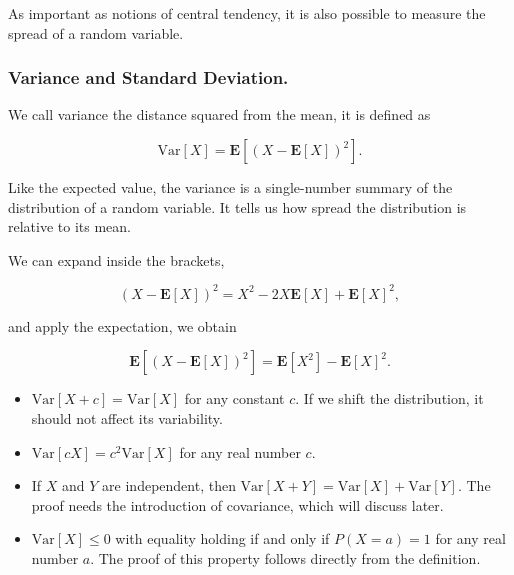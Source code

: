 \documentclass[12pt]{article}
\begin{document}
\vspace{.5cm}
As important as notions of central tendency, it is also possible to measure the spread 
of a random variable.

\subsubsection{Variance and Standard Deviation.}
We call variance the distance squared from the mean, it is defined as

\begin{equation}
\mbox{Var} [ X ] = \mathbf{E} \left[ ( X - \mathbf{E} [ X ] )^{2} \right].
\end{equation}

\noindent
Like the expected value, the variance is a single-number summary of 
the distribution of a random variable.
It tells us how spread the distribution is relative to its mean.

We can expand inside the brackets,

\begin{equation}
( X - \mathbf{E} [ X ] )^{2} = 
X^{2} - 2 X \mathbf{E} [ X ] + \mathbf{E} [X]^{2},
\end{equation}

\noindent
and apply the expectation, we obtain

\begin{equation}
\mathbf{E} [ ( X - \mathbf{E} [ X ] )^{2} ] = 
\mathbf{E} [ X^{2} ] - \mathbf{E} [ X ]^{2}.
\end{equation}

\begin{itemize}
\item $\mbox{Var} [ X + c ] = \mbox{Var} [ X ]$ for any constant $c$.
If we shift the distribution, it should not affect its variability.

\item $\mbox{Var} [ c X ] = c^{2} \mbox{Var} [ X ]$ for any real number $c$.

\item If $X$ and $Y$ are independent, then $ \mbox{Var} [ X + Y ] = \mbox{Var} [ X ] + \mbox{Var} [ Y ]$.
The proof needs the introduction of covariance, which will discuss later.

\item $\mbox{Var} [ X ] \leq 0$ with equality holding if and only if $P ( X = a) = 1$ for any real number $a$.
The proof of this property follows directly from the definition.
\end{itemize}
\end{document}
